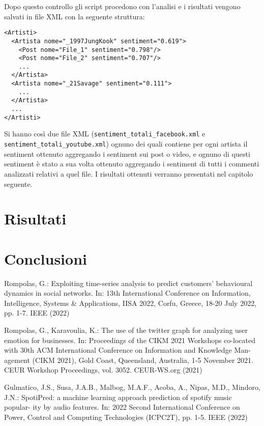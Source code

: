 \documentclass[conference]{IEEEtran}
\begin{document}
Dopo questo controllo gli script procedono con l'analisi e i risultati vengono salvati in file XML con la seguente
struttura:

\begin{lstlisting}
<Artisti>
  <Artista nome="_1997JungKook" sentiment="0.619">
    <Post nome="File_1" sentiment="0.798"/>
    <Post nome="File_2" sentiment="0.707"/>
    ...
  </Artista>
  <Artista nome="_21Savage" sentiment="0.111">
    ...
  </Artista>
  ...
</Artisti>
\end{lstlisting}

Si hanno così due file XML (\texttt{sentiment\_totali\_facebook.xml} e \texttt{sentiment\_totali\_youtube.xml}) ognuno
dei quali contiene per ogni artista il sentiment ottenuto aggregando i sentiment sui post o video, e ognuno di questi sentiment
è stato a sua volta ottenuto aggregando i sentiment di tutti i commenti analizzati relativi a quel file. I risultati
ottenuti verranno presentati nel capitolo seguente.

\section{Risultati}\label{sec:exp}



\section{Conclusioni}

\begin{thebibliography}{1}

Rompolas, G.: Exploiting time-series analysis to predict customers' behavioural
dynamics in social networks. In: 13th International Conference on Information,
Intelligence, Systems \& Applications, IISA 2022, Corfu, Greece, 18-20 July 2022,
pp. 1-7. IEEE (2022)

Rompolas, G., Karavoulia, K.: The use of the twitter graph for analyzing user
emotion for businesses. In: Proceedings of the CIKM 2021 Workshops co-located
with 30th ACM International Conference on Information and Knowledge Man-
agement (CIKM 2021), Gold Coast, Queensland, Australia, 1-5 November 2021.
CEUR Workshop Proceedings, vol. 3052. CEUR-WS.org (2021)

Gulmatico, J.S., Susa, J.A.B., Malbog, M.A.F., Acoba, A., Nipas, M.D., Mindoro,
J.N.: SpotiPred: a machine learning approach prediction of spotify music popular-
ity by audio features. In: 2022 Second International Conference on Power, Control
and Computing Technologies (ICPC2T), pp. 1-5. IEEE (2022)

\end{thebibliography}
\end{document}
